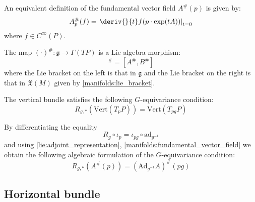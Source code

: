 	\begin{adefinition}
		An equivalent definition of the fundamental vector field $A^\#(p)$ is given by:
		\begin{equation}
			A^\#_p(f) = \left.\deriv{}{t}f(p\cdot\exp(tA))\right|_{t=0}
		\end{equation}
		where $f\in C^\infty(P)$.
	\end{adefinition}
	
	\begin{property}
		The map $(\cdot)^\#:\mathfrak{g}\rightarrow\Gamma(TP)$ is a Lie algebra morphism:
		\begin{equation}
			[A, B]^\# = [A^\#, B^\#]
		\end{equation}
		where the Lie bracket on the left is that in $\mathfrak{g}$ and the Lie bracket on the right is that in $\mathfrak{X}(M)$ given by \ref{manifolds:lie_bracket}.
	\end{property}
	
	\begin{property}
		The vertical bundle satisfies the following $G$-equivariance condition:
		\begin{equation}
			\label{diff:vert_g_equivariance}
			R_{g, \ast}(\text{Vert}(T_pP)) = \text{Vert}(T_{pg}P)
		\end{equation}
		
		By differentiating the equality \[R_g\circ\iota_p = \iota_{pg}\circ\text{ad}_{g^{-1}}\] and using \ref{lie:adjoint_representation}, \ref{manifolds:fundamental_vector_field} we obtain the following algebraic formulation of the $G$-equivariance condition:
		\begin{equation}
			R_{g, \ast}\left(A^\#(p)\right) = \left(\text{Ad}_{g^{-1}}A\right)^\#(pg)
		\end{equation}
	\end{property}
	
\subsection{Horizontal bundle}

